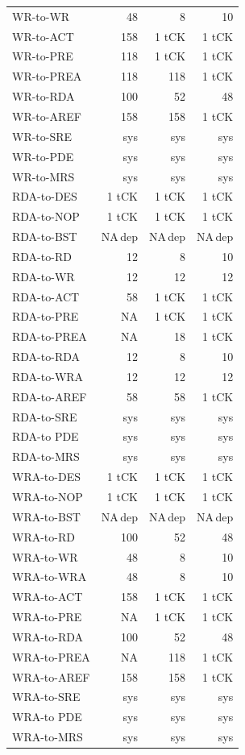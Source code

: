{\begin{longtable}{@{}l r r r@{}}
WR-to-WR & 48 & 8 & 10\\
WR-to-ACT & 158 & 1 tCK & 1 tCK\\
WR-to-PRE & 118 & 1 tCK & 1 tCK\\
WR-to-PREA & 118 & 118 & 1 tCK\\
WR-to-RDA & 100 & 52 & 48\\
WR-to-AREF & 158 & 158 & 1 tCK\\
WR-to-SRE & sys & sys & sys\\
WR-to-PDE & sys & sys & sys\\
WR-to-MRS & sys & sys & sys\\
RDA-to-DES & 1 tCK & 1 tCK & 1 tCK\\
RDA-to-NOP & 1 tCK & 1 tCK & 1 tCK\\
RDA-to-BST & NA\,dep & NA\,dep & NA\,dep\\
RDA-to-RD & 12 & 8 & 10\\
RDA-to-WR & 12 & 12 & 12\\
RDA-to-ACT & 58 & 1 tCK & 1 tCK\\
RDA-to-PRE & NA & 1 tCK & 1 tCK\\
RDA-to-PREA & NA & 18 & 1 tCK\\
RDA-to-RDA & 12 & 8 & 10\\
RDA-to-WRA & 12 & 12 & 12\\
RDA-to-AREF & 58 & 58 & 1 tCK\\
RDA-to-SRE & sys & sys & sys\\
RDA-to PDE & sys & sys & sys\\
RDA-to-MRS & sys & sys & sys\\
WRA-to-DES & 1 tCK & 1 tCK & 1 tCK\\
WRA-to-NOP & 1 tCK & 1 tCK & 1 tCK\\
WRA-to-BST & NA\,dep & NA\,dep & NA\,dep\\
WRA-to-RD & 100 & 52 & 48\\
WRA-to-WR & 48 & 8 & 10\\
WRA-to-WRA & 48 & 8 & 10\\
WRA-to-ACT & 158 & 1 tCK & 1 tCK\\
WRA-to-PRE & NA & 1 tCK & 1 tCK\\
WRA-to-RDA & 100 & 52 & 48\\
WRA-to-PREA & NA & 118 & 1 tCK\\
WRA-to-AREF & 158 & 158 & 1 tCK\\
WRA-to-SRE & sys & sys & sys\\
WRA-to PDE & sys & sys & sys\\
WRA-to-MRS & sys & sys & sys\\

\end{longtable}}
